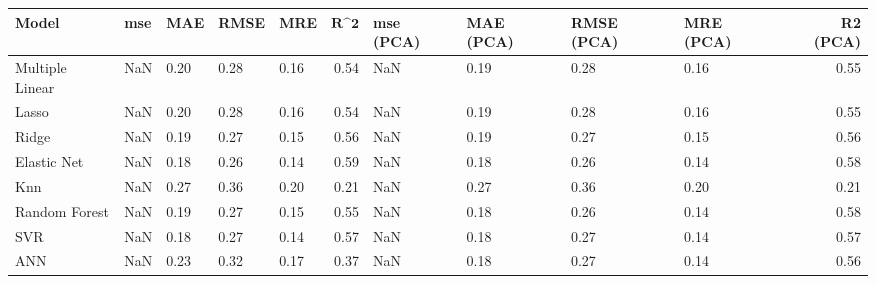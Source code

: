 \begin{table}
\centering
\label{table:iri_reg_pred}
\begin{tabular}{lllllrllllr}
\toprule
 \textbf{Model} & \textbf{mse} & \textbf{MAE} & \textbf{RMSE} & \textbf{MRE} & $\textbf{R^2}$ & \textbf{mse (PCA)} & \textbf{MAE (PCA)} & \textbf{RMSE (PCA)} & \textbf{MRE (PCA)} & \textbf{R2 (PCA)} \\
\midrule
Multiple Linear &          NaN &         0.20 &          0.28 &         0.16 &           0.54 &                NaN &               0.19 &                0.28 &               0.16 &              0.55 \\
          Lasso &          NaN &         0.20 &          0.28 &         0.16 &           0.54 &                NaN &               0.19 &                0.28 &               0.16 &              0.55 \\
          Ridge &          NaN &         0.19 &          0.27 &         0.15 &           0.56 &                NaN &               0.19 &                0.27 &               0.15 &              0.56 \\
    Elastic Net &          NaN &         0.18 &          0.26 &         0.14 &           0.59 &                NaN &               0.18 &                0.26 &               0.14 &              0.58 \\
            Knn &          NaN &         0.27 &          0.36 &         0.20 &           0.21 &                NaN &               0.27 &                0.36 &               0.20 &              0.21 \\
  Random Forest &          NaN &         0.19 &          0.27 &         0.15 &           0.55 &                NaN &               0.18 &                0.26 &               0.14 &              0.58 \\
            SVR &          NaN &         0.18 &          0.27 &         0.14 &           0.57 &                NaN &               0.18 &                0.27 &               0.14 &              0.57 \\
            ANN &          NaN &         0.23 &          0.32 &         0.17 &           0.37 &                NaN &               0.18 &                0.27 &               0.14 &              0.56 \\
\bottomrule
\end{tabular}
\end{table}
